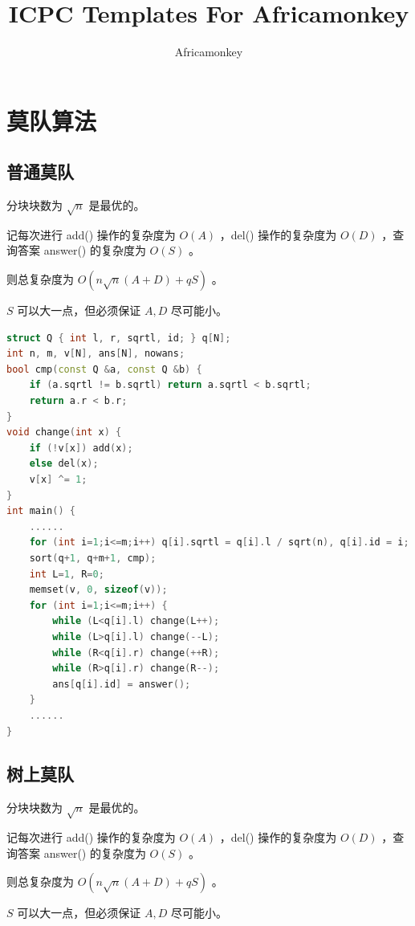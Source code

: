 \documentclass{article}
\begin{document}
\title{ICPC Templates For Africamonkey}
\author {Africamonkey}
\maketitle
\tableofcontents
\newpage
\section{莫队算法}
\subsection{普通莫队}

分块块数为 $\sqrt{n}$ 是最优的。

记每次进行 add() 操作的复杂度为 $O(A)$ ，del() 操作的复杂度为 $O(D)$ ，查询答案 answer() 的复杂度为 $O(S)$ 。

则总复杂度为 $O(n \sqrt{n} (A + D) + qS)$ 。

$S$ 可以大一点，但必须保证 $A, D$ 尽可能小。

\begin{lstlisting}[language=C++]
struct Q { int l, r, sqrtl, id; } q[N];
int n, m, v[N], ans[N], nowans;
bool cmp(const Q &a, const Q &b) {
	if (a.sqrtl != b.sqrtl) return a.sqrtl < b.sqrtl;
	return a.r < b.r;
}
void change(int x) {
	if (!v[x]) add(x);
	else del(x);
	v[x] ^= 1;
}
int main() {
	......
	for (int i=1;i<=m;i++) q[i].sqrtl = q[i].l / sqrt(n), q[i].id = i;
	sort(q+1, q+m+1, cmp);
	int L=1, R=0;
	memset(v, 0, sizeof(v));
	for (int i=1;i<=m;i++) {
		while (L<q[i].l) change(L++);
		while (L>q[i].l) change(--L);
		while (R<q[i].r) change(++R);
		while (R>q[i].r) change(R--);
		ans[q[i].id] = answer();
	}
	......
}
\end{lstlisting}
\subsection{树上莫队}

分块块数为 $\sqrt{n}$ 是最优的。

记每次进行 add() 操作的复杂度为 $O(A)$ ，del() 操作的复杂度为 $O(D)$ ，查询答案 answer() 的复杂度为 $O(S)$ 。

则总复杂度为 $O(n \sqrt{n} (A + D) + qS)$ 。

$S$ 可以大一点，但必须保证 $A, D$ 尽可能小。
\end{document}
